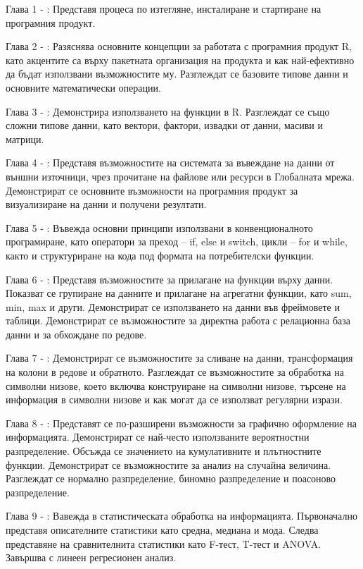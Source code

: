 Глава 1 - : Представя процеса по изтегляне, инсталиране и стартиране на програмния продукт.

Глава 2 - : Разяснява основните концепции за работата с програмния продукт R, като акцентите са върху пакетната организация на продукта и как най-ефективно да бъдат използвани възможностите му. Разглеждат се базовите типове данни и основните математически операции. 

Глава 3 - : Демонстрира използването на функции в R. Разглеждат се също сложни типове данни, като вектори, фактори, извадки от данни, масиви и матрици. 

Глава 4 - : Представя възможностите на системата за въвеждане на данни от външни източници, чрез прочитане на файлове или ресурси в Глобалната мрежа. Демонстрират се основните възможности на програмния продукт за визуализиране на данни и получени резултати.  

Глава 5 - : Въвежда основни принципи използвани в конвенционалното програмиране, като оператори за преход – if, else и switch, цикли – for и while, както и структуриране на кода под формата на потребителски функции.

Глава 6 - : Представя възможностите за прилагане на функции върху данни. Показват се групиране на данните и прилагане на агрегатни функции, като sum, min, max и други. Демонстрират се използването на данни във фреймовете и таблици. Демонстрират се възможностите за директна работа с релационна база данни и за обхождане по редове.

Глава 7 - : Демонстрират се възможностите за сливане на данни, трансформация на колони в редове и обратното. Разглеждат се възможностите за обработка на символни низове, което включва конструиране на символни низове, търсене на информация в символни низове и как могат да се използват регулярни изрази. 

Глава 8 - : Представят се по-разширени възможности за графично оформление на информацията. Демонстрират се най-често използваните вероятностни разпределение. Обсъжда се значението на кумулативните и плътностните функции. Демонстрират се възможностите за анализ на случайна величина. Разглеждат се нормално разпределение, биномно разпределение и поасоново разпределение.

Глава 9 - : Вавежда в статистическата обработка на информацията. Първоначално представя описателните статистики като средна, медиана и мода. Следва представяне на сравнителнита статистики като F-тест, T-тест и ANOVA. Завършва с линеен регресионен анализ. 
